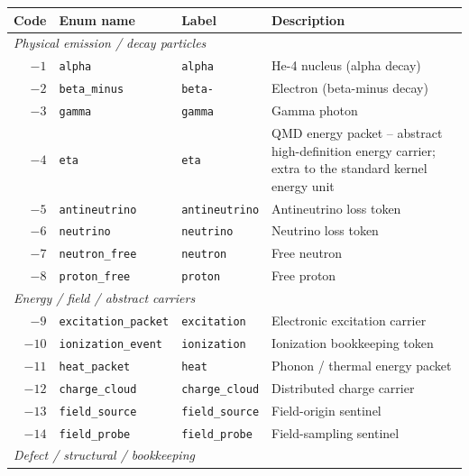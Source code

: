 \documentclass[11pt,a4paper]{article}
\begin{document}
\bigskip
\begin{center}
\renewcommand{\arraystretch}{1.15}
\begin{tabular}{rllp{6.2cm}}
\toprule
\textbf{Code} & \textbf{Enum name} & \textbf{Label} & \textbf{Description} \\
\midrule
\multicolumn{4}{l}{\textit{Physical emission / decay particles}} \\
$-1$  & \texttt{alpha}            & \texttt{alpha}         & He-4 nucleus (alpha decay) \\
$-2$  & \texttt{beta\_minus}      & \texttt{beta-}         & Electron (beta-minus decay) \\
$-3$  & \texttt{gamma}            & \texttt{gamma}         & Gamma photon \\
$-4$  & \texttt{eta}              & \texttt{eta}           & QMD energy packet -- abstract
                                                             high-definition energy carrier;
                                                             extra to the standard kernel
                                                             energy unit \\
$-5$  & \texttt{antineutrino}     & \texttt{antineutrino}  & Antineutrino loss token \\
$-6$  & \texttt{neutrino}         & \texttt{neutrino}      & Neutrino loss token \\
$-7$  & \texttt{neutron\_free}    & \texttt{neutron}       & Free neutron \\
$-8$  & \texttt{proton\_free}     & \texttt{proton}        & Free proton \\
\midrule
\multicolumn{4}{l}{\textit{Energy / field / abstract carriers}} \\
$-9$  & \texttt{excitation\_packet}  & \texttt{excitation}    & Electronic excitation carrier \\
$-10$ & \texttt{ionization\_event}   & \texttt{ionization}    & Ionization bookkeeping token \\
$-11$ & \texttt{heat\_packet}        & \texttt{heat}          & Phonon / thermal energy packet \\
$-12$ & \texttt{charge\_cloud}       & \texttt{charge\_cloud} & Distributed charge carrier \\
$-13$ & \texttt{field\_source}       & \texttt{field\_source} & Field-origin sentinel \\
$-14$ & \texttt{field\_probe}        & \texttt{field\_probe}  & Field-sampling sentinel \\
\midrule
\multicolumn{4}{l}{\textit{Defect / structural / bookkeeping}} \\

\end{tabular}
\end{center}
\end{document}
